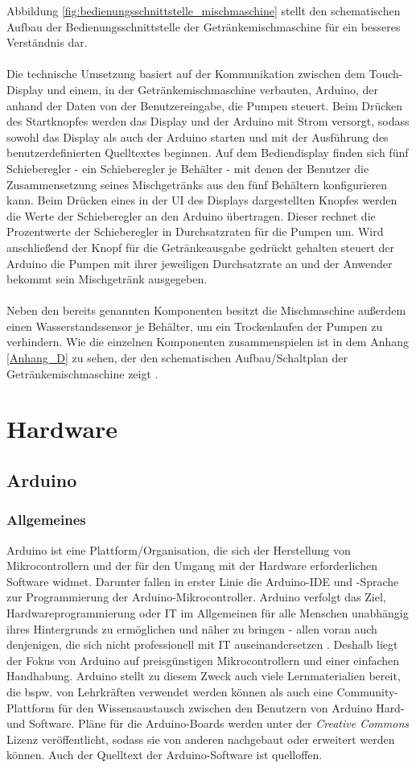 \noindent
Abbildung \ref{fig:bedienungsschnittstelle_mischmaschine} stellt den schematischen Aufbau der Bedienungsschnittstelle der Getränkemischmaschine für ein besseres Verständnis dar.\\\\
Die technische Umsetzung basiert auf der Kommunikation zwischen dem Touch-Display und einem, in der Getränkemischmaschine verbauten, Arduino, der anhand der Daten von der Benutzereingabe, die Pumpen steuert. Beim Drücken des Startknopfes werden das Display und der Arduino mit Strom versorgt, sodass sowohl das Display als auch der Arduino starten und mit der Ausführung des benutzerdefinierten Quelltextes beginnen. Auf dem Bediendisplay finden sich fünf Schieberegler - ein Schieberegler je Behälter - mit denen der Benutzer die Zusammensetzung seines Mischgetränks aus den fünf Behältern konfigurieren kann. Beim Drücken eines in der \ac{UI} des Displays dargestellten Knopfes werden die Werte der Schieberegler an den Arduino übertragen. Dieser rechnet die Prozentwerte der Schieberegler in Durchsatzraten für die Pumpen um. Wird anschließend der Knopf für die Getränkeausgabe gedrückt gehalten steuert der Arduino die Pumpen mit ihrer jeweiligen Durchsatzrate an und der Anwender bekommt sein Mischgetränk ausgegeben.\\\\
Neben den bereits genannten Komponenten besitzt die Mischmaschine außerdem einen Wasserstandssensor je Behälter, um ein Trockenlaufen der Pumpen zu verhindern. Wie die einzelnen Komponenten zusammenspielen ist in dem Anhang \ref{Anhang_D} zu sehen, der den schematischen Aufbau/Schaltplan der Getränkemischmaschine zeigt \cite{mischmaschine}.
\section{Hardware}
\subsection{Arduino}
\subsubsection{Allgemeines}
Arduino ist eine Plattform/Organisation, die sich der Herstellung von Mikrocontrollern und der für den Umgang mit der Hardware erforderlichen Software widmet. Darunter fallen in erster Linie die Arduino-IDE und -Sprache zur Programmierung der Arduino-Mikrocontroller. Arduino verfolgt das Ziel, Hardwareprogrammierung oder \ac{IT} im Allgemeinen für alle Menschen unabhängig ihres Hintergrunds zu ermöglichen und näher zu bringen - allen voran auch denjenigen, die sich nicht professionell mit \ac{IT} auseinandersetzen \cite{arduino_education}. Deshalb liegt der Fokus von Arduino auf preisgünstigen Mikrocontrollern und einer einfachen Handhabung. Arduino stellt zu diesem Zweck auch viele Lernmaterialien bereit, die bspw. von Lehrkräften verwendet werden können als auch eine Community-Plattform für den Wissensaustausch zwischen den Benutzern von Arduino Hard- und Software. Pläne für die Arduino-Boards werden unter der \textit{Creative Commons} Lizenz veröffentlicht, sodass sie von anderen nachgebaut oder erweitert werden können. Auch der Quelltext der Arduino-Software ist quelloffen.
